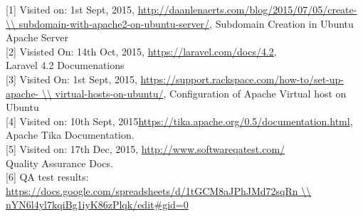 \documentclass[
11pt, %
english, %
singlespacing, %
headsepline, %
]{InternshipReport} %
\begin{document}
\mainmatter %

\pagestyle{thesis} %



 

 




\nocite{*}

\printbibliography

\hspace*{-0.7cm}[1] Visited on: 1st Sept, 2015, \url{http://daanlenaerts.com/blog/2015/07/05/create- \\						subdomain-with-apache2-on-ubuntu-server/}, Subdomain Creation in Ubuntu Apache Server \\

\hspace*{-0.7cm}[2] Visisted On: 14th Oct, 2015, \url{https://laravel.com/docs/4.2}, \\
					Laravel 4.2 Documenations\\

\hspace*{-0.7cm}[3] Visited On: 1st Sept, 2015, \url{https://support.rackspace.com/how-to/set-up-apache- \\
					virtual-hosts-on-ubuntu/}, Configuration of Apache Virtual host on Ubuntu\\

\hspace*{-0.7cm}[4] Visited on: 10th Sept, 2015\url{https://tika.apache.org/0.5/documentation.html}, \\
					Apache Tika Documentation.\\

\hspace*{-0.7cm}[5] Visited on: 17th Dec, 2015, \url{http://www.softwareqatest.com/}\\
					Quality Assurance Docs.\\

\hspace*{-0.7cm}[6] QA test results: \url{https://docs.google.com/spreadsheets/d/1tGCM8aJPhJMd72sqRn \\ nYN6l4yl7kqiBg1iyK86zPlqk/edit#gid=0}\\
\end{document}
